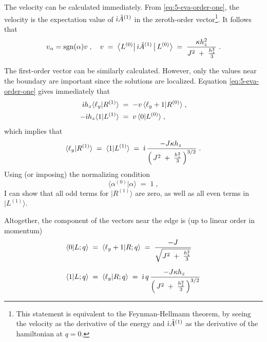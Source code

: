 The velocity can be calculated immediately. From \eqref{eq:5-eva-order-one}, the velocity is the expectation value of $\dot{\imath} \tilde{A}^{(1)}$ in the zeroth-order vector\footnote{This statement is equivalent to the Feynman-Hellmann theorem, by seeing the velocity as the derivative of the energy  and $\dot{\imath} \tilde{A}^{(1)}$ as the derivative of the hamiltonian at $q=0$.}. It follows that
\begin{equation}
   v_{\alpha} = \text{sgn}(\alpha) v \; ,  \quad  v \; = \;  \big\langle  L^{(0)}  \big\vert \,  \dot{\imath} \tilde{A}^{(1)}  \, \big\vert \, L^{(0)} \big\rangle \; = \; \frac{\kappa h^2_z}{J^2 \; + \; \frac{h^2_z}{3}} \; .
\end{equation}

The first-order vector can be similarly calculated. However, only the values near the boundary are important since the solutions are localized. Equation \eqref{eq:5-eva-order-one} gives immediately that
\begin{align}
    \dot{\imath} h_z  \langle \ell_y \vert R^{(1)} \rangle  \; &= \; -v \,  \langle \ell_y +1 \vert R^{(0)} \rangle  \; , \\
    - \dot{\imath} h_z \langle 1 \vert L^{(1)} \rangle  \; &= \; v \,  \langle 0 \vert L^{(0)} \rangle  \; ,
\end{align}
which implies that
\begin{align}
     \langle \ell_y \vert R^{(1)} \rangle  \; = \;  \langle 1 \vert L^{(1)} \rangle  \; = \;  \dot{\imath} \,  \frac{- J \kappa h_z \; }{\left( \, J^2 \; + \; \frac{h^2_z}{3} \, \right)^{3/2} } \; .
\end{align}
Using (or imposing) the normalizing condition
\begin{equation}
    \langle \alpha^{(0)}  \vert \alpha \rangle  \; = \; 1 \; ,
\end{equation}
I can show that all odd terms for $\vert R^{(1)} \rangle$ are zero, as well as all even terms in $\vert L^{(1)} \rangle$. 

Altogether, the component of the vectors near the edge is (up to linear order in momentum)
\begin{align}
\langle 0 \vert L; q  \rangle  \; & = \;  \langle \ell_y+1 \vert R; q  \rangle  \; = \;  \frac{-J}{\sqrt{J^2 \; + \; \frac{h_z^2}{3}}}  \label{eq:5-mat-b} \\[6pt]
\langle 1 \vert L; q  \rangle  \; & = \;   \langle \ell_y \vert R; q  \rangle  \; = \;  \im \, q \,  \frac{- J \kappa h_z \; }{\left( \, J^2 \; + \; \frac{h^2_z}{3} \, \right)^{3/2} } \label{eq:5-mat-c} %
\end{align}


